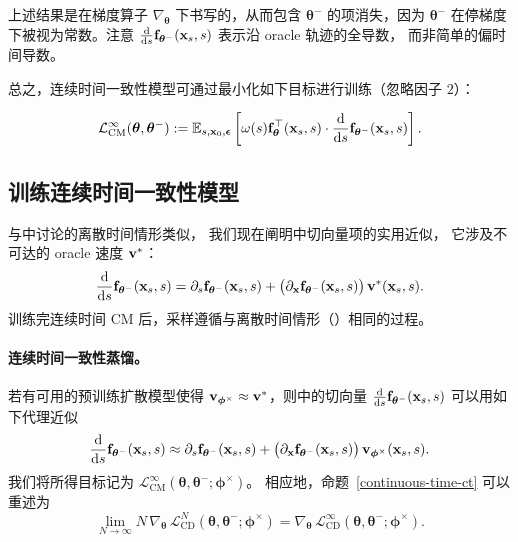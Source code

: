 上述结果是在梯度算子
$\nabla_{\bm{\theta}}$ 下书写的，从而包含 $\bm{\theta}^-$ 的项消失，因为
$\bm{\theta}^-$ 在停梯度下被视为常数。注意
$\tfrac{\mathop{}\!\mathrm{d}}{\mathop{}\!\mathrm{d} s}{\mathbf{f}}_{{\bm{\theta}}^-}({\mathbf{x}}_s,s)$ 表示沿 oracle 轨迹的全导数，
而非简单的偏时间导数。

总之，连续时间一致性模型可通过最小化如下目标进行训练（忽略因子 $2$）：
\begin{mdframed}
    \begin{align}\label{eq:conti-ct-loss}
    \mathcal{L}^\infty_{\mathrm{CM}}(\bm{\theta},\bm{\theta}^-) := \mathbb{E}_{s,{\mathbf{x}}_0, \bm{\epsilon}}\left[\omega(s){\mathbf{f}}_{\bm{\theta}}^\top({\mathbf{x}}_s, s) \cdot \frac{\mathop{}\!\mathrm{d} }{\mathop{}\!\mathrm{d} s} {\mathbf{f}}_{\bm{\theta}^-}({\mathbf{x}}_s, s) \right].
\end{align}
\end{mdframed}


\subsection{训练连续时间一致性模型}
与中讨论的离散时间情形类似，
我们现在阐明中切向量项的实用近似，
它涉及不可达的 oracle 速度 ${\mathbf{v}}^*$：
\begin{align*}
    \frac{\mathop{}\!\mathrm{d}}{\mathop{}\!\mathrm{d} s}{\mathbf{f}}_{{\bm{\theta}}^-}({\mathbf{x}}_s,s)
    = \partial_s {\mathbf{f}}_{{\bm{\theta}}^-}({\mathbf{x}}_s,s)
    + \big(\partial_{{\mathbf{x}}}{\mathbf{f}}_{{\bm{\theta}}^-}({\mathbf{x}}_s,s)\big)\,{\mathbf{v}}^*({\mathbf{x}}_s,s).
\end{align*}
训练完连续时间 CM 后，采样遵循与离散时间情形（）相同的过程。

\paragraph{连续时间一致性蒸馏。}
若有可用的预训练扩散模型使得
${\mathbf{v}}_{\bm{\phi}^\times} \approx {\mathbf{v}}^*$，则中的切向量
$\tfrac{\mathop{}\!\mathrm{d}}{\mathop{}\!\mathrm{d} s}{\mathbf{f}}_{{\bm{\theta}}^-}({\mathbf{x}}_s,s)$ 可以用如下代理近似
\begin{align}\label{eq:cd-continuous-time}
    \frac{\mathop{}\!\mathrm{d}}{\mathop{}\!\mathrm{d} s}{\mathbf{f}}_{{\bm{\theta}}^-}({\mathbf{x}}_s,s)
     \approx
    \partial_s {\mathbf{f}}_{{\bm{\theta}}^-}({\mathbf{x}}_s,s)
    + \big(\partial_{{\mathbf{x}}}{\mathbf{f}}_{{\bm{\theta}}^-}({\mathbf{x}}_s,s)\big)\,
      {\mathbf{v}}_{\bm{\phi}^\times}({\mathbf{x}}_s,s).
\end{align}
我们将所得目标记为
$\mathcal{L}^\infty_{\mathrm{CM}}(\bm{\theta},\bm{\theta}^-;\bm{\phi}^\times)$。
相应地，命题~\ref{continuous-time-ct} 可以重述为
\[
\lim_{N\to\infty}
N \,\nabla_{\bm{\theta}}\,
\mathcal{L}_{\mathrm{CD}}^{N}(\bm{\theta},\bm{\theta}^-;\bm{\phi}^\times)
  =
\nabla_{\bm{\theta}}\,
\mathcal{L}_{\mathrm{CD}}^{\infty}(\bm{\theta},\bm{\theta}^-;\bm{\phi}^\times).
\]


